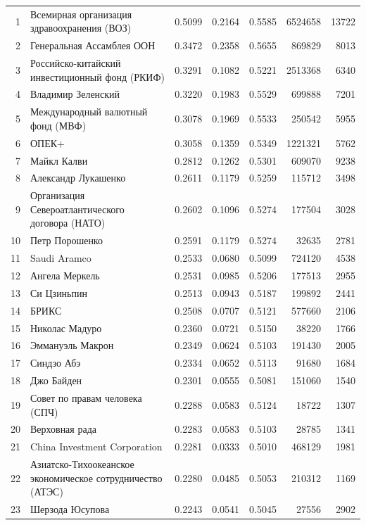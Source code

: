{\begin{longtable}{r >{\raggedright\arraybackslash}p{4.2cm} S[table-format=1.4] S[table-format=1.4] S[table-format=1.4] r r}
1 & Всемирная организация здравоохранения (ВОЗ) & 0.5099 & 0.2164 & 0.5585 & 6524658 & 13722 \\
2 & Генеральная Ассамблея ООН & 0.3472 & 0.2358 & 0.5655 & 869829 & 8013 \\
3 & Российско-китайский инвестиционный фонд (РКИФ) & 0.3291 & 0.1082 & 0.5221 & 2513368 & 6340 \\
4 & Владимир Зеленский & 0.3220 & 0.1983 & 0.5529 & 699888 & 7201 \\
5 & Международный валютный фонд (МВФ) & 0.3078 & 0.1969 & 0.5533 & 250542 & 5955 \\
6 & ОПЕК+ & 0.3058 & 0.1359 & 0.5349 & 1221321 & 5762 \\
7 & Майкл Калви & 0.2812 & 0.1262 & 0.5301 & 609070 & 9238 \\
8 & Александр Лукашенко & 0.2611 & 0.1179 & 0.5259 & 115712 & 3498 \\
9 & Организация Североатлантического договора (НАТО) & 0.2602 & 0.1096 & 0.5274 & 177504 & 3028 \\
10 & Петр Порошенко & 0.2591 & 0.1179 & 0.5274 & 32635 & 2781 \\
11 & Saudi Aramco & 0.2533 & 0.0680 & 0.5099 & 724120 & 4538 \\
12 & Ангела Меркель & 0.2531 & 0.0985 & 0.5206 & 177513 & 2955 \\
13 & Си Цзиньпин & 0.2513 & 0.0943 & 0.5187 & 199892 & 2441 \\
14 & БРИКС & 0.2508 & 0.0707 & 0.5121 & 577660 & 2106 \\
15 & Николас Мадуро & 0.2360 & 0.0721 & 0.5150 & 38220 & 1766 \\
16 & Эммануэль Макрон & 0.2349 & 0.0624 & 0.5103 & 191430 & 2005 \\
17 & Синдзо Абэ & 0.2334 & 0.0652 & 0.5113 & 91680 & 1684 \\
18 & Джо Байден & 0.2301 & 0.0555 & 0.5081 & 151060 & 1540 \\
19 & Совет по правам человека (СПЧ) & 0.2288 & 0.0583 & 0.5124 & 18722 & 1307 \\
20 & Верховная рада & 0.2283 & 0.0583 & 0.5103 & 28785 & 1341 \\
21 & China Investment Corporation & 0.2281 & 0.0333 & 0.5010 & 468129 & 1981 \\
22 & Азиатско-Тихоокеанское экономическое сотрудничество (АТЭС) & 0.2280 & 0.0485 & 0.5053 & 210312 & 1169 \\
23 & Шерзода Юсупова & 0.2243 & 0.0541 & 0.5045 & 27556 & 2902 \\

\end{longtable}}
